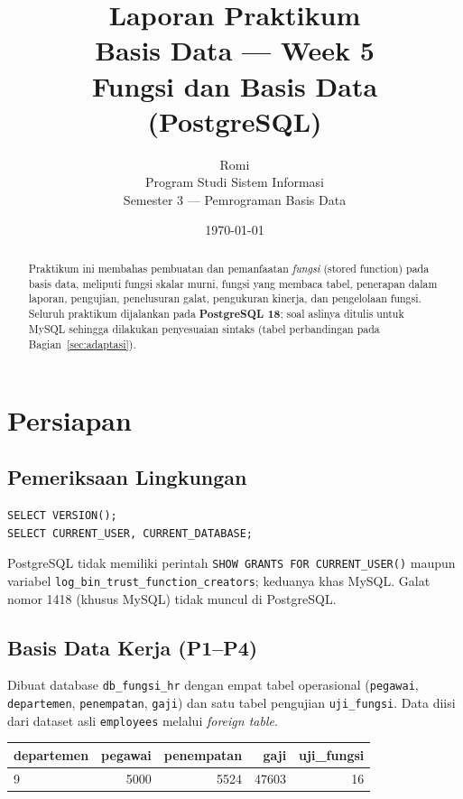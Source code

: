 \documentclass[12pt,a4paper]{article}
\title{\textbf{Laporan Praktikum}\\
       Basis Data — Week 5\\
       \large Fungsi dan Basis Data (PostgreSQL)}
\author{Romi\\
        Program Studi Sistem Informasi\\
        Semester 3 — Pemrograman Basis Data}
\date{\today}
\begin{document}
\maketitle
\thispagestyle{empty}

\begin{abstract}
Praktikum ini membahas pembuatan dan pemanfaatan \emph{fungsi} (stored function)
pada basis data, meliputi fungsi skalar murni, fungsi yang membaca tabel,
penerapan dalam laporan, pengujian, penelusuran galat, pengukuran kinerja, dan
pengelolaan fungsi. Seluruh praktikum dijalankan pada \textbf{PostgreSQL 18};
soal aslinya ditulis untuk MySQL sehingga dilakukan penyesuaian sintaks
(tabel perbandingan pada Bagian~\ref{sec:adaptasi}).
\end{abstract}

\tableofcontents
\newpage

\section{Persiapan}

\subsection{Pemeriksaan Lingkungan}
\begin{lstlisting}[style=sql]
SELECT VERSION();
SELECT CURRENT_USER, CURRENT_DATABASE;
\end{lstlisting}

PostgreSQL tidak memiliki perintah \texttt{SHOW GRANTS FOR CURRENT\_USER()} maupun
variabel \texttt{log\_bin\_trust\_function\_creators}; keduanya khas MySQL. Galat
nomor 1418 (khusus MySQL) tidak muncul di PostgreSQL.

\subsection{Basis Data Kerja (P1--P4)}
Dibuat database \texttt{db\_fungsi\_hr} dengan empat tabel operasional
(\texttt{pegawai}, \texttt{departemen}, \texttt{penempatan}, \texttt{gaji}) dan satu
tabel pengujian \texttt{uji\_fungsi}. Data diisi dari dataset asli
\texttt{employees} melalui \emph{foreign table}.

\begin{center}
\begin{tabular}{lrrrr}
\toprule
departemen & pegawai & penempatan & gaji & uji\_fungsi\\
\midrule
9 & 5000 & 5524 & 47603 & 16\\
\bottomrule
\end{tabular}
\end{center}
\end{document}
